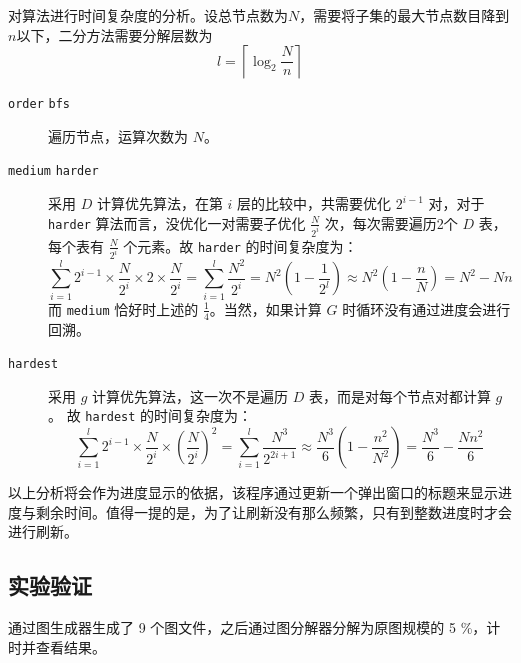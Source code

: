 \documentclass[a4paper,12pt]{article}
\begin{document}
\begin{CJK}{UTF8}{song}
对算法进行时间复杂度的分析。设总节点数为$N$，需要将子集的最大节点数目降到$n$以下，二分方法需要分解层数为
\begin{equation}
  l = \left\lceil \log_2\frac{N}{n} \right\rceil
\end{equation}
\begin{description}
  \item[\texttt{order} \texttt{bfs}] 遍历节点，运算次数为 $N$。
  \item[\texttt{medium} \texttt{harder}] 采用 $D$ 计算优先算法，在第 $i$ 层的比较中，共需要优化 $2^{i-1}$ 对，对于 \texttt{harder} 算法而言，没优化一对需要子优化 $\frac{N}{2^i}$ 次，每次需要遍历2个 $D$ 表，每个表有 $\frac{N}{2^i}$ 个元素。故 \texttt{harder} 的时间复杂度为：
  \begin{equation}
    \sum_{i=1}^l 2^{i-1}\times\frac{N}{2^i}\times 2 \times \frac{N}{2^i} = \sum_{i=1}^l \frac{N^2}{2^i} = N^2\left(1-\frac{1}{2^l}\right)\approx N^2\left(1-\frac{n}{N}\right)=N^2-Nn
  \end{equation} 
  而 \texttt{medium} 恰好时上述的 $\frac{1}{4}$。当然，如果计算 $G$ 时循环没有通过进度会进行回溯。
  \item[\texttt{hardest}] 采用 $g$ 计算优先算法，这一次不是遍历 $D$ 表，而是对每个节点对都计算 $g$。 故 \texttt{hardest} 的时间复杂度为：
  \begin{equation}
    \sum_{i=1}^l 2^{i-1}\times\frac{N}{2^i}\times \left(\frac{N}{2^i}\right)^2 = \sum_{i=1}^l \frac{N^3}{2^{2i+1}} \approx \frac{N^3}{6}\left(1-\frac{n^2}{N^2}\right) = \frac{N^3}{6} - \frac{Nn^2}{6}
  \end{equation}
\end{description}

以上分析将会作为进度显示的依据，该程序通过更新一个弹出窗口的标题来显示进度与剩余时间。值得一提的是，为了让刷新没有那么频繁，只有到整数进度时才会进行刷新。

\subsection{实验验证}

通过图生成器生成了 9 个图文件，之后通过图分解器分解为原图规模的 5 \%，计时并查看结果。


\end{CJK}
\end{document}
